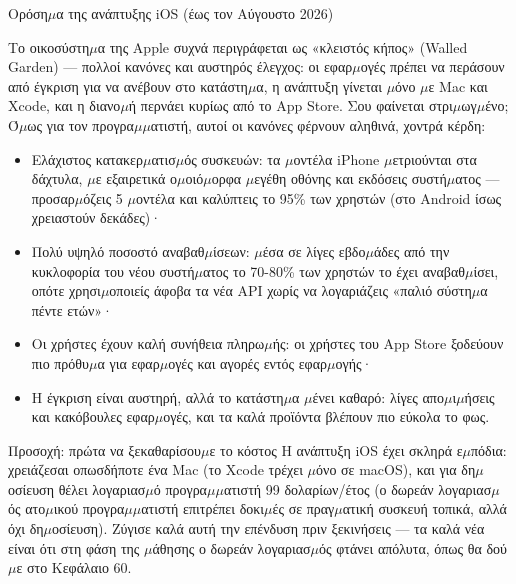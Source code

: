 \begin{center}\small\color{gray}Ορόση$\mu$α της ανάπτυξης iOS (έως τον Αύγουστο 2026)\end{center}


Το οικοσύστη$\mu$α της Apple συχνά περιγράφεται ως «κλειστός κήπος» (Walled Garden) — πολλοί κανόνες και αυστηρός έλεγχος: οι εφαρ$\mu$ογές πρέπει να περάσουν από έγκριση για να ανέβουν στο κατάστη$\mu$α, η ανάπτυξη γίνεται $\mu$όνο $\mu$ε Mac και Xcode, και η διανο$\mu$ή περνάει κυρίως από το App Store. Σου φαίνεται στρι$\mu$ωγ$\mu$ένο; Ό$\mu$ως για τον προγρα$\mu$$\mu$ατιστή, αυτοί οι κανόνες φέρνουν αληθινά, χοντρά κέρδη:

\begin{itemize}
  \item Ελάχιστος κατακερ$\mu$ατισ$\mu$ός συσκευών: τα $\mu$οντέλα iPhone $\mu$ετριούνται στα δάχτυλα, $\mu$ε εξαιρετικά ο$\mu$οιό$\mu$ορφα $\mu$εγέθη οθόνης και εκδόσεις συστή$\mu$ατος — προσαρ$\mu$όζεις 5 $\mu$οντέλα και καλύπτεις το 95\% των χρηστών (στο Android ίσως χρειαστούν δεκάδες)·
  \item Πολύ υψηλό ποσοστό αναβαθ$\mu$ίσεων: $\mu$έσα σε λίγες εβδο$\mu$άδες από την κυκλοφορία του νέου συστή$\mu$ατος το 70-80\% των χρηστών το έχει αναβαθ$\mu$ίσει, οπότε χρησι$\mu$οποιείς άφοβα τα νέα API χωρίς να λογαριάζεις «παλιό σύστη$\mu$α πέντε ετών»·
  \item Οι χρήστες έχουν καλή συνήθεια πληρω$\mu$ής: οι χρήστες του App Store ξοδεύουν πιο πρόθυ$\mu$α για εφαρ$\mu$ογές και αγορές εντός εφαρ$\mu$ογής·
  \item Η έγκριση είναι αυστηρή, αλλά το κατάστη$\mu$α $\mu$ένει καθαρό: λίγες απο$\mu$ι$\mu$ήσεις και κακόβουλες εφαρ$\mu$ογές, και τα καλά προϊόντα βλέπουν πιο εύκολα το φως.
\end{itemize}

\begin{tcbwarn}{Προσοχή: πρώτα να ξεκαθαρίσου$\mu$ε το κόστος}
Η ανάπτυξη iOS έχει σκληρά ε$\mu$πόδια: χρειάζεσαι οπωσδήποτε ένα Mac (το Xcode τρέχει $\mu$όνο σε macOS), και για δη$\mu$οσίευση θέλει λογαριασ$\mu$ό προγρα$\mu$$\mu$ατιστή 99 δολαρίων/έτος (ο δωρεάν λογαριασ$\mu$ός ατο$\mu$ικού προγρα$\mu$$\mu$ατιστή επιτρέπει δοκι$\mu$ές σε πραγ$\mu$ατική συσκευή τοπικά, αλλά όχι δη$\mu$οσίευση). Ζύγισε καλά αυτή την επένδυση πριν ξεκινήσεις — τα καλά νέα είναι ότι στη φάση της $\mu$άθησης ο δωρεάν λογαριασ$\mu$ός φτάνει απόλυτα, όπως θα δού$\mu$ε στο Κεφάλαιο 60.

\end{tcbwarn}

